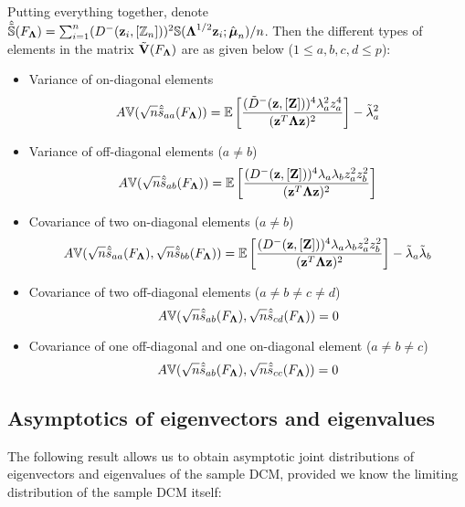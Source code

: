 \paragraph{}Putting everything together, denote $\hat{\tilde {{\mathbb{S}}} }(F_{\boldsymbol{\Lambda}}) = \sum_{i=1}^n ( D^-({\bf{z}}_i, [{\mathbb{Z}}_n]))^2 {\mathbb{S}}( {\boldsymbol{\Lambda}}^{1/2} {\bf{z}}_i; \hat {{\boldsymbol{\mu}}}_n)/n $. Then the different types of elements in the matrix $\tilde{{\mathbf{V}}} (F_{\boldsymbol{\Lambda}})$ are as given below ($1 \leq a,b,c,d \leq p$):

\begin{itemize}
\item Variance of on-diagonal elements
%
$$ A{\mathbb{V}}( \sqrt n \hat {\tilde s}_{aa} (F_{\boldsymbol{\Lambda}})) = {\mathbb{E}} \left[ \frac{(\tilde D^- ({\bf{z}}, [{\mathbf{Z}}]) )^4 \lambda_a^2 z_a^4}{({\bf{z}}^T {\boldsymbol{\Lambda}} {\bf{z}})^2} \right] - \tilde\lambda_{a}^2 $$

\item Variance of off-diagonal elements ($a \neq b$)
%
$$ A{\mathbb{V}}( \sqrt n \hat {\tilde s}_{ab} (F_{\boldsymbol{\Lambda}})) = {\mathbb{E}} \left[ \frac{(D^- ({\bf{z}}, [{\mathbf{Z}}]))^4 \lambda_a \lambda_b z_a^2 z_b^2}{({\bf{z}}^T {\boldsymbol{\Lambda}} {\bf{z}})^2} \right] $$

\item Covariance of two on-diagonal elements ($a \neq b$)
%
$$ A{\mathbb{V}}(\sqrt n \hat {\tilde s}_{aa} (F_{\boldsymbol{\Lambda}}), \sqrt n \hat{\tilde s}_{bb} (F_{\boldsymbol{\Lambda}}))
= {\mathbb{E}} \left[ \frac{(D^- ({\bf{z}}, [{\mathbf{Z}}]))^4 \lambda_a \lambda_b z_a^2 z_b^2}{({\bf{z}}^T {\boldsymbol{\Lambda}} {\bf{z}})^2} \right] - \tilde\lambda_{a} \tilde\lambda_{b} $$

\item Covariance of two off-diagonal elements ($a \neq b \neq c \neq d$)
%
$$ A{\mathbb{V}}(\sqrt n \hat {\tilde s}_{ab} (F_{\boldsymbol{\Lambda}}), \sqrt n \hat {\tilde s}_{cd} (F_{\boldsymbol{\Lambda}})) = 0 $$

\item Covariance of one off-diagonal and one on-diagonal element ($a \neq b \neq c$)
%
$$ A{\mathbb{V}}(\sqrt n \hat {\tilde s}_{ab} (F_{\boldsymbol{\Lambda}}), \sqrt n \hat {\tilde s}_{cc} (F_{\boldsymbol{\Lambda}})) = 0 $$
\end{itemize}

\subsection{Asymptotics of eigenvectors and eigenvalues}
\label{subsection:appB}
The following result allows us to obtain asymptotic joint distributions of eigenvectors and eigenvalues of the sample DCM, provided we know the limiting distribution of the sample DCM itself:

